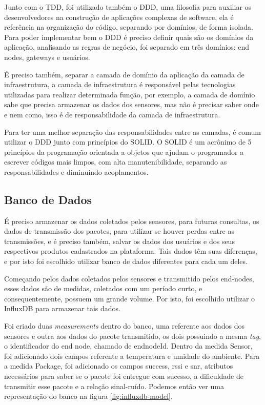 Junto com o TDD, foi utilizado também o DDD, uma filosofia para auxiliar os desenvolvedores na construção de aplicações complexas de software, ela é referência na organização do código, separando por domínios, de forma isolada. Para poder implementar bem o DDD é preciso definir quais são os domínios da aplicação, analisando as regras de negócio, foi separado em três domínios: end nodes, gateways e usuários.

É preciso também, separar a camada de domínio da aplicação da camada de infraestrutura, a camada de infraestrutura é responsável pelas tecnologias utilizadas para realizar determinada função, por exemplo, a camada de domínio sabe que precisa armazenar os dados dos sensores, mas não é precisar saber onde e nem como, isso é de responsabilidade da camada de infraestrutura.

Para ter uma melhor separação das responsabilidades entre as camadas, é comum utilizar o DDD junto com princípios do SOLID. O SOLID é um acrônimo de 5 princípios da programação orientada a objetos que ajudam o programador a escrever códigos mais limpos, com alta manutenibilidade, separando as responsabilidades e diminuindo acoplamentos.

\subsection{Banco de Dados}
\label{metod:servidor:db}
É preciso armazenar os dados coletados pelos sensores, para futuras consultas, os dados de transmissão dos pacotes, para utilizar se houver perdas entre as transmissões, e é preciso também, salvar os dados dos usuários e dos seus respectivos produtos cadastrados na plataforma. Tais dados têm suas diferenças, e por isto foi escolhido utilizar banco de dados diferentes para cada um deles.
	
Começando pelos dados coletados pelos sensores e transmitido pelos end-nodes, esses dados são de medidas, coletados com um período curto, e consequentemente, possuem um grande volume. Por isto, foi escolhido utilizar o InfluxDB para armazenar tais dados.

Foi criado duas \textit{measurements} dentro do banco, uma referente aos dados dos sensores e outra aos dados do pacote transmitido, os dois possuindo a mesma  \textit{tag}, o identificador do end node, chamado de endnodeId. Dentro da medida Sensor, foi adicionado dois campos referente a temperatura e umidade do ambiente. Para a medida Package, foi adicionado os campos success, rssi e snr, atributos necessários para saber se o pacote foi entregue com sucesso, a dificuldade de transmitir esse pacote e a relação sinal-ruído. Podemos então ver uma representação do banco na figura \ref{fig:influxdb-model}.

